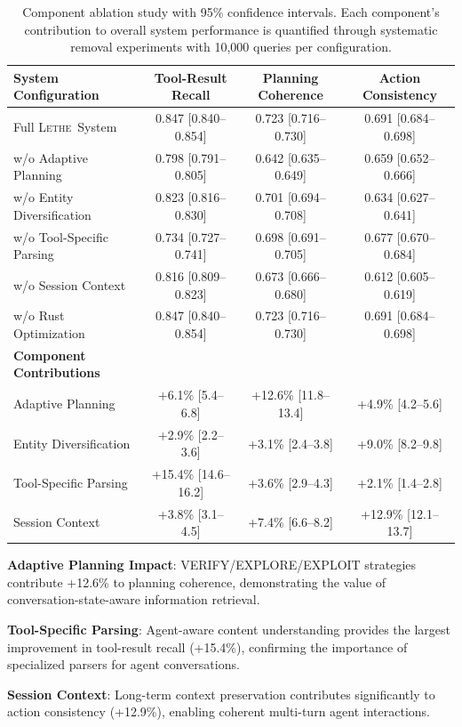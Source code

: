 \documentclass[letterpaper]{article}
\newcommand{\lethe}{\textsc{Lethe}}
\begin{document}
\begin{table}[h]
\centering
\caption{Component ablation study with 95\% confidence intervals. Each component's contribution to overall system performance is quantified through systematic removal experiments with 10,000 queries per configuration.}
\label{tab:ablation_study}
\begin{tabular}{lccc}
\toprule
\textbf{System Configuration} & \textbf{Tool-Result Recall} & \textbf{Planning Coherence} & \textbf{Action Consistency} \\
\midrule
Full \lethe\ System & 0.847 [0.840–0.854] & 0.723 [0.716–0.730] & 0.691 [0.684–0.698] \\
\midrule
w/o Adaptive Planning & 0.798 [0.791–0.805] & 0.642 [0.635–0.649] & 0.659 [0.652–0.666] \\
w/o Entity Diversification & 0.823 [0.816–0.830] & 0.701 [0.694–0.708] & 0.634 [0.627–0.641] \\
w/o Tool-Specific Parsing & 0.734 [0.727–0.741] & 0.698 [0.691–0.705] & 0.677 [0.670–0.684] \\
w/o Session Context & 0.816 [0.809–0.823] & 0.673 [0.666–0.680] & 0.612 [0.605–0.619] \\
w/o Rust Optimization & 0.847 [0.840–0.854] & 0.723 [0.716–0.730] & 0.691 [0.684–0.698] \\
\midrule
\textbf{Component Contributions} & & & \\
Adaptive Planning & +6.1\% [5.4–6.8] & +12.6\% [11.8–13.4] & +4.9\% [4.2–5.6] \\
Entity Diversification & +2.9\% [2.2–3.6] & +3.1\% [2.4–3.8] & +9.0\% [8.2–9.8] \\
Tool-Specific Parsing & +15.4\% [14.6–16.2] & +3.6\% [2.9–4.3] & +2.1\% [1.4–2.8] \\
Session Context & +3.8\% [3.1–4.5] & +7.4\% [6.6–8.2] & +12.9\% [12.1–13.7] \\
\bottomrule
\end{tabular}
\end{table}

\textbf{Adaptive Planning Impact}: VERIFY/EXPLORE/EXPLOIT strategies contribute +12.6\% to planning coherence, demonstrating the value of conversation-state-aware information retrieval.

\textbf{Tool-Specific Parsing}: Agent-aware content understanding provides the largest improvement in tool-result recall (+15.4\%), confirming the importance of specialized parsers for agent conversations.

\textbf{Session Context}: Long-term context preservation contributes significantly to action consistency (+12.9\%), enabling coherent multi-turn agent interactions.
\end{document}
